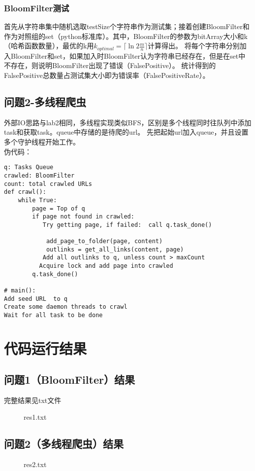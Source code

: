 \documentclass[12pt,a4paper]{article}
\begin{document}
\subsubsection{BloomFilter测试}
首先从字符串集中随机选取testSize个字符串作为测试集；接着创建BloomFilter和作为对照组的set（python标准库）。其中，BloomFilter的参数为bitArray大小和k（哈希函数数量），最优的k用$k_{optimal} = \lceil \ln{2} \frac{m}{n} \rceil$计算得出。
将每个字符串分别加入BloomFilter和set，如果加入时BloomFilter认为字符串已经存在，但是在set中不存在，则说明BloomFilter出现了错误（FalsePositive）。
统计得到的FalsePositive总数量占测试集大小即为错误率（FalsePositiveRate）。
\subsection{问题2-多线程爬虫}
外部IO思路与lab2相同，多线程实现类似BFS，区别是多个线程同时往队列中添加task和获取task。queue中存储的是待爬的url。
先把起始url加入queue，并且设置多个守护线程开始工作。\\
伪代码：\\
\begin{lstlisting}
q: Tasks Queue
crawled: BloomFilter
count: total crawled URLs
def crawl():
    while True:
        page = Top of q
        if page not found in crawled:
           Try getting page, if failed:  call q.task_done()
           
            add_page_to_folder(page, content)
            outlinks = get_all_links(content, page)
           Add all outlinks to q, unless count > maxCount
		  Acquire lock and add page into crawled      
        q.task_done()
        
# main():
Add seed URL  to q
Create some daemon threads to crawl
Wait for all task to be done
\end{lstlisting}
\section{代码运行结果}
\subsection{问题1（BloomFilter）结果}
完整结果见txt文件
\begin{figure}[H]
	 \caption{res1.txt}
\end{figure}

\subsection{问题2（多线程爬虫）结果}
\begin{figure}[H]
	 \caption{res2.txt}
\end{figure}
\end{document}
